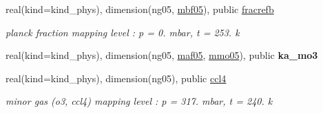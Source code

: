 \begin{DoxyCompactItemize}
real(kind=kind\+\_\+phys), dimension(ng05, \hyperlink{group__module__radlw__kgbnn_ga57db9a9cb9acac604df555038f6127a3}{mbf05}), public \hyperlink{group__module__radlw__kgbnn_gaf7b1fd9c6b966e03a226dd8cbc058670}{fracrefb}
\begin{DoxyCompactList}\small\item\em planck fraction mapping level \+: p = 0. mbar, t = 253. k \end{DoxyCompactList}\item 
real(kind=kind\+\_\+phys), dimension(ng05, \hyperlink{group__module__radlw__kgbnn_gaba904215976d7f4316b52c8f0cffe595}{maf05}, \hyperlink{group__module__radlw__kgbnn_gaa552aae4878030144218ca6c2bbe417f}{mmo05}), public {\bfseries ka\+\_\+mo3}
\item 
real(kind=kind\+\_\+phys), dimension(ng05), public \hyperlink{group__module__radlw__kgbnn_ga15c6b3bfa9d8cbf20099dd4f364444b5}{ccl4}
\begin{DoxyCompactList}\small\item\em minor gas (o3, ccl4) mapping level \+: p = 317. mbar, t = 240. k \end{DoxyCompactList}\end{DoxyCompactItemize}
